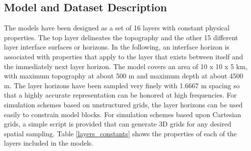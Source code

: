 \subsection{Model and Dataset Description}
The models have been designed as a set of 16 layers with constant physical properties. The top layer delineates the topography and the other 15 different layer interface surfaces or horizons. In the following, an interface horizon is associated with properties that apply to the layer that exists between itself and the immediately next layer horizon. The model covers an area of 10 x 10 x 5 km, with maximum topography at about 500 m and maximum depth at about 4500 m. The layer horizons have been sampled very finely with 1.6667 m spacing so that a highly accurate representation can be honored at high frequencies. For simulation schemes based on unstructured grids, the layer horizons can be used easily to constrain model blocks. For simulation schemes based upon Cartesian grids, a simple script is provided that can generate 3D grids for any desired spatial sampling. Table \ref{layers_constants} shows the properties of each of the layers included in the models. %

